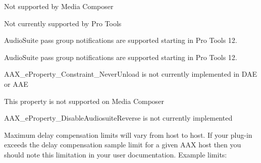 \begin{DoxyRefList}
Not supported by Media Composer 
\item[Member \mbox{\hyperlink{a00503_a86f7310877399d9d4d2ea4863d472476a2524774deef9e82058134126dc729a5a}{AAX\+\_\+e\+Plug\+In\+Strings\+\_\+\+Progress}} ]\label{a00801__compatibility_notes000029}%
%
 Not currently supported by Pro Tools 
\item[Member \mbox{\hyperlink{a00503_a6ec854be40c8cf810dec97de3e56c0a7a1fb443ff62601d3e5f5562a4af8edf41}{AAX\+\_\+e\+Processing\+State\+\_\+\+Begin\+Pass\+Group}} ]\label{a00801__compatibility_notes000052}%
%
 Audio\+Suite pass group notifications are supported starting in Pro Tools 12.  
\item[Member \mbox{\hyperlink{a00503_a6ec854be40c8cf810dec97de3e56c0a7a6c7dcf22600f9fe8a6113dbd5ffd1605}{AAX\+\_\+e\+Processing\+State\+\_\+\+End\+Pass\+Group}} ]\label{a00801__compatibility_notes000051}%
%
 Audio\+Suite pass group notifications are supported starting in Pro Tools 12.  
\item[Member \mbox{\hyperlink{a00674_a13e384f22825afd3db6d68395b79ce0da734930f534d7af40835db1b12afb209e}{AAX\+\_\+e\+Property\+\_\+\+Constraint\+\_\+\+Never\+Unload}} ]\label{a00801__compatibility_notes000074}%
%
 AAX\+\_\+e\+Property\+\_\+\+Constraint\+\_\+\+Never\+Unload is not currently implemented in DAE or AAE  
\item[Member \mbox{\hyperlink{a00674_a13e384f22825afd3db6d68395b79ce0dadd8839e5678c8880215e318197cc8d3a}{AAX\+\_\+e\+Property\+\_\+\+Destination\+Track}} ]\label{a00801__compatibility_notes000071}%
%
 This property is not supported on Media Composer 
\item[Member \mbox{\hyperlink{a00674_a13e384f22825afd3db6d68395b79ce0dab4eefd3dd46fb71883fff754c4f90a57}{AAX\+\_\+e\+Property\+\_\+\+Disable\+Audiosuite\+Reverse}} ]\label{a00801__compatibility_notes000072}%
%
 AAX\+\_\+e\+Property\+\_\+\+Disable\+Audiosuite\+Reverse is not currently implemented  
\item[Member \mbox{\hyperlink{a00674_a13e384f22825afd3db6d68395b79ce0daa9037ffd2caf892bafe8f7f170548cb4}{AAX\+\_\+e\+Property\+\_\+\+Latency\+Contribution}} ]\label{a00801__compatibility_notes000067}%
%
 Maximum delay compensation limits will vary from host to host. If your plug-\/in exceeds the delay compensation sample limit for a given AAX host then you should note this limitation in your user documentation. Example limits\+:

\end{DoxyRefList}
